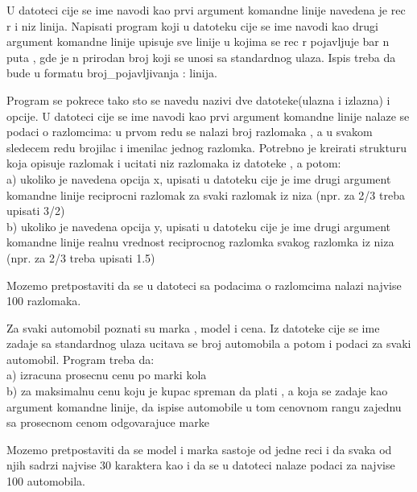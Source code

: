 \begin{Exercise}[label=v3_04] 
U datoteci cije se ime navodi kao prvi argument komandne
linije navedena je rec r i niz linija. Napisati
program koji u datoteku cije se ime navodi kao
drugi argument komandne linije upisuje sve linije
u kojima se rec r pojavljuje bar n puta , gde je
n prirodan broj koji se unosi sa standardnog ulaza. Ispis
treba da bude u formatu broj\_pojavljivanja : linija.
\end{Exercise}
\ifresenja
\begin{Answer}[ref=v3_04]
\end{Answer}
\fi

\begin{Exercise}[label=v3_05] 
Program se pokrece tako sto se navedu nazivi dve datoteke(ulazna i
izlazna) i opcije.
U datoteci cije se ime navodi kao prvi argument komandne linije
nalaze se podaci o razlomcima:
u prvom redu se nalazi broj razlomaka , a u svakom sledecem redu
brojilac i imenilac jednog razlomka.
Potrebno je kreirati strukturu koja opisuje razlomak i ucitati niz
razlomaka
iz datoteke , a potom:\\
a) ukoliko je navedena opcija x, upisati u datoteku cije je ime
drugi argument komandne linije
reciprocni razlomak za svaki razlomak iz niza (npr. za 2/3
treba upisati 3/2) \\
b) ukoliko je navedena opcija y, upisati u datoteku cije je ime
drugi argument komandne linije
realnu vrednost reciprocnog razlomka svakog razlomka iz niza
(npr. za 2/3 treba upisati 1.5)

Mozemo pretpostaviti da se u datoteci sa podacima o razlomcima
nalazi najvise 100 razlomaka.
\end{Exercise}
\ifresenja
\begin{Answer}[ref=v3_05]
\end{Answer}
\fi

\begin{Exercise}[label=v3_06] 
Za svaki automobil poznati su marka , model i cena. Iz datoteke cije
se ime zadaje sa standardnog ulaza ucitava se broj automobila a
potom
i podaci za svaki automobil. Program treba da: \\
a) izracuna prosecnu cenu po marki kola \\
b) za maksimalnu cenu koju je kupac spreman da plati , a koja se
zadaje kao argument komandne linije, da ispise automobile u tom cenovnom
rangu zajednu sa prosecnom cenom odgovarajuce marke

Mozemo pretpostaviti da se model i marka sastoje od jedne reci i
da svaka od njih sadrzi najvise 30 karaktera kao i da se u datoteci
nalaze podaci za najvise 100 automobila.
\end{Exercise}
\ifresenja
\begin{Answer}[ref=v3_06]
\end{Answer}
\fi







